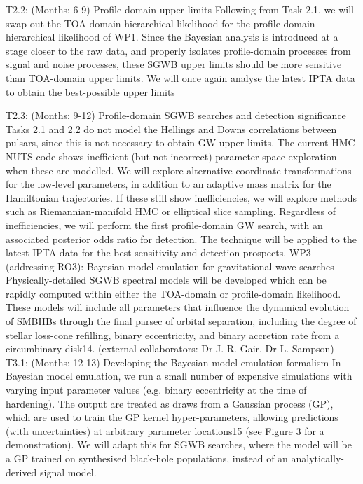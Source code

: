 \documentclass[11pt,letterpaper,sans]{moderncv} %
\begin{document}
	T2.2: (Months: 6-9) Profile-domain upper limits
	Following from Task 2.1, we will swap out the TOA-domain hierarchical likelihood for the profile-domain hierarchical likelihood of WP1. Since the Bayesian analysis is introduced at a stage closer to the raw data, and properly isolates profile-domain processes from signal and noise processes, these SGWB upper limits should be more sensitive than TOA-domain upper limits. We will once again analyse the latest IPTA data to obtain the best-possible upper limits


	T2.3: (Months: 9-12) Profile-domain SGWB searches and detection significance
	Tasks 2.1 and 2.2 do not model the Hellings and Downs correlations between pulsars, since this is not necessary to obtain GW upper limits. The current HMC NUTS code shows inefficient (but not incorrect) parameter space exploration when these are modelled. We will explore alternative coordinate transformations for the low-level parameters, in addition to an adaptive mass matrix for the Hamiltonian trajectories. If these still show inefficiencies, we will explore methods such as Riemannian-manifold HMC or elliptical slice sampling. Regardless of inefficiencies, we will perform the first profile-domain GW search, with an associated posterior odds ratio for detection. The technique will be applied to the latest IPTA data for the best sensitivity and detection prospects.
WP3 (addressing RO3): Bayesian model emulation for gravitational-wave searches
Physically-detailed SGWB spectral models will be developed which can be rapidly computed within either the TOA-domain or profile-domain likelihood. These models will include all parameters that influence the dynamical evolution of SMBHBs through the final parsec of orbital separation, including the degree of stellar loss-cone refilling, binary eccentricity, and binary accretion rate from a circumbinary disk14. (external collaborators: Dr J. R. Gair, Dr L. Sampson)
T3.1: (Months: 12-13) Developing the Bayesian model   
                                       emulation formalism
In Bayesian model emulation, we run a small number of expensive simulations with varying input parameter values (e.g. binary eccentricity at the time of hardening). The output are treated as draws from a Gaussian process (GP), which are used to train the GP kernel hyper-parameters, allowing predictions (with uncertainties) at arbitrary parameter locations15 (see Figure 3 for a demonstration). We will adapt this for SGWB searches, where the model will be a GP trained on synthesised black-hole populations, instead of an analytically-derived signal model.
\end{document}
